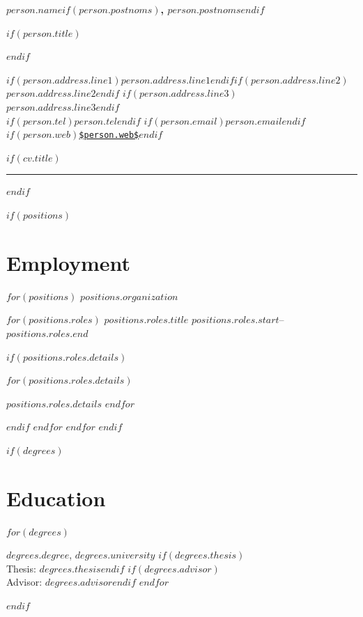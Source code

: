 \documentclass[11pt]{article}
\begin{document}
\thispagestyle{empty}

{\LARGE\bfseries $person.name$$if(person.postnoms)$, $person.postnoms$$endif$}\par
$if(person.title)$\vspace{0.25em}{\large\itshape $person.title$}\par$endif$

\vspace{0.5em}
{\small
$if(person.address.line1)$$person.address.line1$$endif$$if(person.address.line2)$ \\ $person.address.line2$$endif$
$if(person.address.line3)$ \\ $person.address.line3$$endif$\\
$if(person.tel)$$person.tel$$endif$ $if(person.email)$\quad \href{mailto:$person.email$}{$person.email$}$endif$ $if(person.web)$\quad \href{$person.web$}{\nolinkurl{$person.web$}}$endif$
}

$if(cv.title)$\vspace{0.8em}\hrule\vspace{0.8em}$endif$

$if(positions)$
\section{Employment}
$for(positions)$
\textbf{$positions.organization$}\par
$for(positions.roles)$
{\itshape $positions.roles.title$} \hfill {\small $positions.roles.start$--$positions.roles.end$}\par
$if(positions.roles.details)$
\begin{cvlist}
$for(positions.roles.details)$\item $positions.roles.details$
$endfor$
\end{cvlist}
$endif$
$endfor$
\vspace{0.5em}
$endfor$
$endif$

$if(degrees)$
\section{Education}
\begin{cvdesc}
$for(degrees)$
\item[$degrees.year$] \textbf{$degrees.degree$}, $degrees.university$
$if(degrees.thesis)$\\ Thesis: $degrees.thesis$$endif$
$if(degrees.advisor)$\\ Advisor: $degrees.advisor$$endif$
$endfor$
\end{cvdesc}
$endif$
\end{document}
